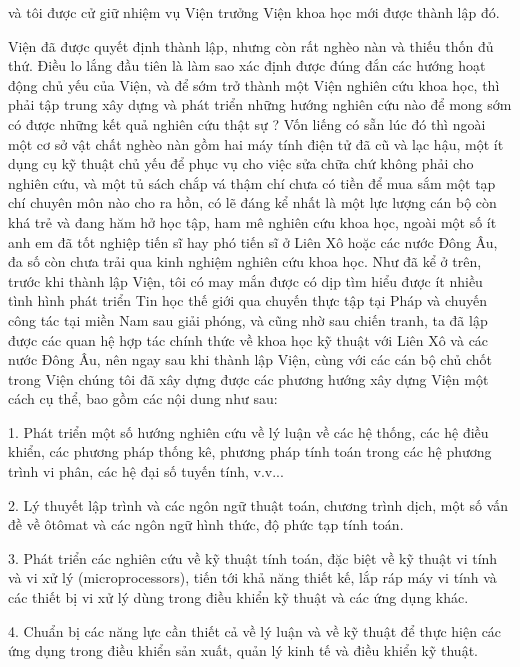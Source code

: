 và tôi được cử giữ  nhiệm vụ Viện trưởng Viện khoa học mới được thành lập đó.
                        
                        Viện đã được quyết định thành lập, nhưng còn rất nghèo nàn và thiếu thốn đủ thứ. Điều lo lắng đầu tiên là làm sao xác định được đúng đắn các hướng hoạt động chủ yếu của Viện, và để sớm trở thành một Viện nghiên cứu khoa học, thì phải tập trung xây dựng và phát triển những hướng nghiên cứu nào để mong sớm có được những kết quả nghiên cứu thật sự ?  Vốn liếng có sẵn lúc đó thì ngoài một cơ sở vật chất nghèo nàn gồm hai máy tính điện tử đã cũ và lạc hậu, một ít dụng cụ kỹ thuật chủ yếu để phục vụ cho việc sửa chữa chứ không phải cho nghiên cứu, và một tủ sách chắp vá thậm chí chưa có tiền để mua sắm  một tạp chí chuyên môn nào cho ra hồn, có lẽ đáng kể nhất là một lực lượng cán bộ còn khá trẻ và đang hăm hở học tập, ham mê nghiên cứu khoa học, ngoài một số ít anh em đã tốt nghiệp tiến sĩ hay phó tiến sĩ ở Liên Xô hoặc các nước Đông Âu, đa số còn chưa trải qua kinh nghiệm nghiên cứu khoa học.
                        Như đã kể ở trên, trước khi thành lập Viện, tôi có may mắn được có dịp tìm hiểu được ít nhiều tình hình phát triển Tin học thế giới qua chuyến thực tập tại Pháp và chuyến công tác tại miền Nam sau giải phóng, và cũng nhờ sau chiến tranh, ta đã lập được các quan hệ hợp tác chính thức về khoa học kỹ thuật với Liên Xô và các nước Đông Âu, nên ngay sau khi thành lập Viện, cùng với các cán bộ chủ chốt trong Viện chúng tôi đã xây dựng được các phương hướng xây dựng Viện một cách cụ thể, bao gồm các nội dung như  sau:
                        
1.     Phát triển một số hướng nghiên cứu về lý luận về các hệ thống, các hệ điều khiển, các phương pháp thống kê, phương pháp tính toán trong các hệ phương trình vi phân, các hệ đại số tuyến tính, v.v...

2.    Lý thuyết lập trình và các ngôn ngữ  thuật toán, chương trình dịch, một số vấn đề về ôtômat và các ngôn ngữ hình thức, độ phức tạp tính toán.

3.    Phát triển các nghiên cứu về kỹ thuật tính toán, đặc biệt về kỹ thuật vi tính và vi xử lý (microprocessors), tiến tới khả năng thiết kế, lắp ráp máy vi tính và các thiết bị vi xử lý dùng trong điều khiển kỹ thuật và các ứng dụng khác.

4.    Chuẩn bị các năng lực cần thiết cả về lý luận và về kỹ thuật để thực hiện các ứng dụng trong điều khiển sản xuất, quản lý kinh tế và điều khiển kỹ thuật.


